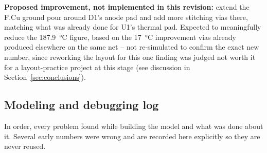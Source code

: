 \documentclass[11pt,letterpaper]{article}
\begin{document}
\begin{pending}
\textbf{Proposed improvement, not implemented in this revision:} extend the F.Cu ground pour around D1's
anode pad and add more stitching vias there, matching what was already done for U1's thermal pad. Expected
to meaningfully reduce the \SI{187.9}{\celsius} figure, based on the \SI{17}{\celsius} improvement vias
already produced elsewhere on the same net -- not re-simulated to confirm the exact new number, since
reworking the layout for this one finding was judged not worth it for a layout-practice project at this
stage (see discussion in Section~\ref{sec:conclusions}).
\end{pending}

\subsection{Modeling and debugging log}
\label{sec:debug-log}

In order, every problem found while building the model and what was done about it. Several early numbers
were wrong and are recorded here explicitly so they are never reused.
\end{document}
